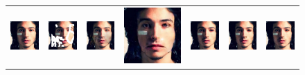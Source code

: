 \documentclass[10pt,journal,compsoc]{IEEEtran}
\begin{document}
\begin{figure}[hbt]
	\small
	\setlength{\tabcolsep}{2.0pt}
	\centering
	\begin{tabular}{ccccccc}
		\includegraphics[width=.135\textwidth]{celeba/GT56-0}  &		\includegraphics[width=.135\textwidth]{celeba/input56-0}  &
		\includegraphics[width=.135\textwidth]{celeba/gl56-0}  &
		\includegraphics[width=.135\textwidth]{celeba/pconv56-0}  &
		\includegraphics[width=.135\textwidth]{celeba/gc56-0}  &
		\includegraphics[width=.135\textwidth]{celeba/ec56-0}  &
		\includegraphics[width=.135\textwidth]{celeba/ours56-0}  \\
		

\end{tabular}
\end{figure}
\end{document}

